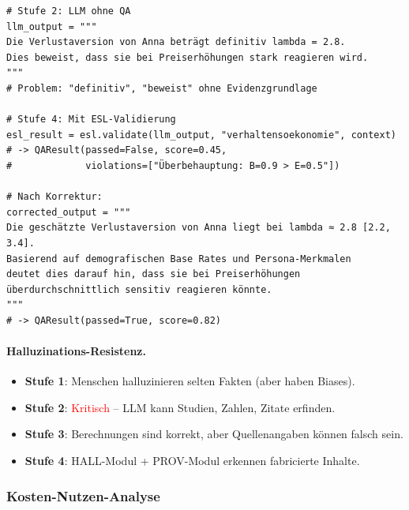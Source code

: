 \begin{lstlisting}[caption={Beispiel: Epistemische Unsicherheit in Stufe 2 vs. Sicherheit in Stufe 4}]
# Stufe 2: LLM ohne QA
llm_output = """
Die Verlustaversion von Anna beträgt definitiv lambda = 2.8.
Dies beweist, dass sie bei Preiserhöhungen stark reagieren wird.
"""
# Problem: "definitiv", "beweist" ohne Evidenzgrundlage

# Stufe 4: Mit ESL-Validierung
esl_result = esl.validate(llm_output, "verhaltensoekonomie", context)
# -> QAResult(passed=False, score=0.45,
#             violations=["Überbehauptung: B=0.9 > E=0.5"])

# Nach Korrektur:
corrected_output = """
Die geschätzte Verlustaversion von Anna liegt bei lambda ≈ 2.8 [2.2, 3.4].
Basierend auf demografischen Base Rates und Persona-Merkmalen
deutet dies darauf hin, dass sie bei Preiserhöhungen
überdurchschnittlich sensitiv reagieren könnte.
"""
# -> QAResult(passed=True, score=0.82)
\end{lstlisting}

\paragraph{Halluzinations-Resistenz.}

\begin{itemize}
    \item \textbf{Stufe 1}: Menschen halluzinieren selten Fakten (aber haben Biases).
    \item \textbf{Stufe 2}: \textcolor{red}{Kritisch} -- LLM kann Studien, Zahlen, Zitate erfinden.
    \item \textbf{Stufe 3}: Berechnungen sind korrekt, aber Quellenangaben können falsch sein.
    \item \textbf{Stufe 4}: HALL-Modul + PROV-Modul erkennen fabricierte Inhalte.
\end{itemize}

\subsubsection{Kosten-Nutzen-Analyse}

